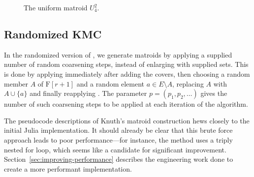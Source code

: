 \begin{figure}
{
  }
  \caption{The uniform matroid $U_4^2$.}
  \label{fig:kmc-ex-3}
\end{figure}


\subsection{Randomized KMC}
In the randomized version of , we generate matroids by applying a supplied number of random coarsening steps, instead of enlarging with supplied sets. This is done by applying  immediately after adding the covers, then choosing a random member $A$ of $\mathrm{F}[r+1]$ and a random element $a \in E \setminus A$, replacing $A$ with $A \cup \{a\}$ and finally reapplying . The parameter $p = (p_1, p_2, \ldots)$ gives the number of such coarsening steps to be applied at each iteration of the algorithm.

The pseudocode descriptions of Knuth's matroid construction hews closely to the initial Julia implementation. It should already be clear that this brute force approach leads to poor performance---for instance, the  method uses a triply nested for loop, which seems like a candidate for significant improvement. Section~\ref{sec:improving-performance} describes the engineering work done to create a more performant implementation.

